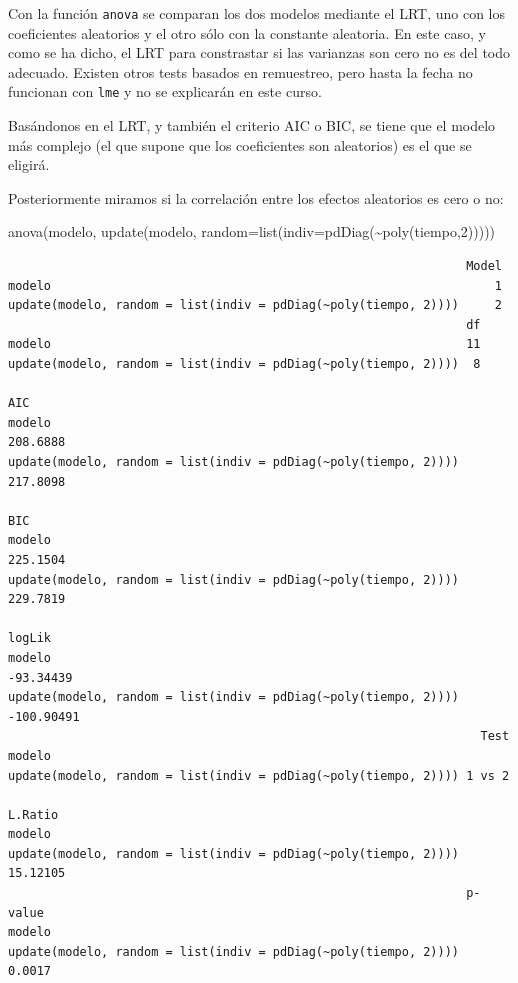 \documentclass[
]{book}
\newenvironment{Shaded}{\begin{snugshade}}{\end{snugshade}}
\newcommand{\AttributeTok}[1]{\textcolor[rgb]{0.77,0.63,0.00}{#1}}
\newcommand{\DecValTok}[1]{\textcolor[rgb]{0.00,0.00,0.81}{#1}}
\newcommand{\FunctionTok}[1]{\textcolor[rgb]{0.00,0.00,0.00}{#1}}
\newcommand{\NormalTok}[1]{#1}
\newcommand{\SpecialCharTok}[1]{\textcolor[rgb]{0.00,0.00,0.00}{#1}}
\begin{document}
Con la función \texttt{anova} se comparan los dos modelos mediante el LRT, uno con los coeficientes aleatorios y el otro sólo con la constante aleatoria. En este caso, y como se ha dicho, el LRT para constrastar si las varianzas son cero no es del todo adecuado. Existen otros tests basados en remuestreo, pero hasta la fecha no funcionan con \texttt{lme} y no se explicarán en este curso.

Basándonos en el LRT, y también el criterio AIC o BIC, se tiene que el modelo más complejo (el que supone que los coeficientes son aleatorios) es el que se eligirá.

Posteriormente miramos si la correlación entre los efectos aleatorios es cero o no:

\begin{Shaded}
\begin{Highlighting}[]
\FunctionTok{anova}\NormalTok{(modelo, }\FunctionTok{update}\NormalTok{(modelo, }\AttributeTok{random=}\FunctionTok{list}\NormalTok{(}\AttributeTok{indiv=}\FunctionTok{pdDiag}\NormalTok{(}\SpecialCharTok{\textasciitilde{}}\FunctionTok{poly}\NormalTok{(tiempo,}\DecValTok{2}\NormalTok{)))))}
\end{Highlighting}
\end{Shaded}

\begin{verbatim}
                                                                Model
modelo                                                              1
update(modelo, random = list(indiv = pdDiag(~poly(tiempo, 2))))     2
                                                                df
modelo                                                          11
update(modelo, random = list(indiv = pdDiag(~poly(tiempo, 2))))  8
                                                                     AIC
modelo                                                          208.6888
update(modelo, random = list(indiv = pdDiag(~poly(tiempo, 2)))) 217.8098
                                                                     BIC
modelo                                                          225.1504
update(modelo, random = list(indiv = pdDiag(~poly(tiempo, 2)))) 229.7819
                                                                    logLik
modelo                                                           -93.34439
update(modelo, random = list(indiv = pdDiag(~poly(tiempo, 2)))) -100.90491
                                                                  Test
modelo                                                                
update(modelo, random = list(indiv = pdDiag(~poly(tiempo, 2)))) 1 vs 2
                                                                 L.Ratio
modelo                                                                  
update(modelo, random = list(indiv = pdDiag(~poly(tiempo, 2)))) 15.12105
                                                                p-value
modelo                                                                 
update(modelo, random = list(indiv = pdDiag(~poly(tiempo, 2))))  0.0017
\end{verbatim}
\end{document}

